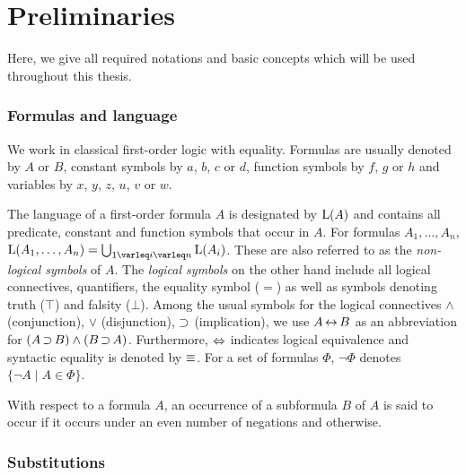 \section{Preliminaries}
\label{sec:preliminaries}

Here, we give all required notations and basic concepts which will be used throughout this thesis.

\subsubsection*{Formulas and language}

We work in classical first-order logic with equality.
Formulas are usually denoted by $A$ or $B$, constant symbols by $a$, $b$, $c$ or $d$, function symbols by $f$, $g$ or $h$ and variables by $x$, $y$, $z$, $u$, $v$ or $w$.

The language of a first-order formula $A$ is designated by $\operatorname{L}(A)$ and contains all predicate, constant and function symbols that occur in $A$.
For formulas $A_1, \ldots, A_n$, $\Lang(A_1, \ldots, A_n) = \bigcup_{1\varleq i \varleq n} \Lang(A_i)$.
These are also referred to as the \emph{\mbox{non-logical} symbols} of $A$.
The \emph{logical symbols} on the other hand include all logical connectives, quantifiers, the equality symbol ($=$) as well as symbols denoting truth ($\top$) and falsity ($\bot$).
Among the usual symbols for the logical connectives $\land$ (conjunction), $\lor$ (disjunction), $\operatorname{\supset}$ (implication),
we use $A \operatorname{\leftrightarrow} B$ as an abbreviation for $(A\operatorname{\supset} B) \land (B\operatorname{\supset} A)$.
Furthermore, $\operatorname{\Leftrightarrow}$ indicates logical equivalence and syntactic equality is denoted by $\equiv$.
For a set of formulas $\Phi$, $\lnot \Phi$ denotes $\{\lnot A \mid A \in \Phi\}$.



With respect to a formula\nolinebreak{} $A$, an occurrence of a subformula $B$ of $A$ is said to occur  if it occurs under an even number of negations and  otherwise.





\subsubsection*{Substitutions}


